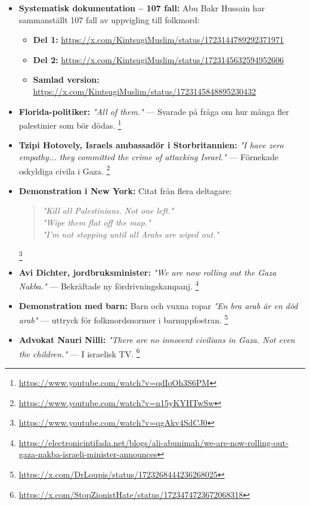 \begin{itemize}
    \item[] \textbf{Systematisk dokumentation – 107 fall:}
    Abu Bakr Hussain har sammanställt 107 fall av uppvigling till folkmord:
    \begin{itemize}
        \item \textbf{Del 1:} \url{https://x.com/KintsugiMuslim/status/1723144789292371971}
        \item \textbf{Del 2:} \url{https://x.com/KintsugiMuslim/status/1723145632594952606}
        \item \textbf{Samlad version:} \url{https://x.com/KintsugiMuslim/status/1723145848895230432}
    \end{itemize}

    \item \textbf{Florida-politiker:} \textit{"All of them."} — Svarade på fråga om hur många fler palestinier som bör dödas. \footnote{\url{https://www.youtube.com/watch?v=qdIoOh3S6PM}}

    \item \textbf{Tzipi Hotovely, Israels ambassadör i Storbritannien:} \textit{"I have zero empathy... they committed the crime of attacking Israel."} — Förnekade oskyldiga civila i Gaza. \footnote{\url{https://www.youtube.com/watch?v=n15yKYHTwSw}}

    \item \textbf{Demonstration i New York:} Citat från flera deltagare:
    \begin{quote}
    \textit{"Kill all Palestinians. Not one left."}\\
    \textit{"Wipe them flat off the map."}\\
    \textit{"I’m not stopping until all Arabs are wiped out."}
    \end{quote}
    \footnote{\url{https://www.youtube.com/watch?v=qgAkv4SdCJ0}}

    \item \textbf{Avi Dichter, jordbruksminister:} \textit{"We are now rolling out the Gaza Nakba."} — Bekräftade ny fördrivningskampanj. \footnote{\url{https://electronicintifada.net/blogs/ali-abunimah/we-are-now-rolling-out-gaza-nakba-israeli-minister-announces}}

    \item \textbf{Demonstration med barn:} Barn och vuxna ropar \textit{"En bra arab är en död arab"} — uttryck för folkmordsnormer i barnuppfostran. \footnote{\url{https://x.com/DrLoupis/status/1723268444236268025}}

    \item \textbf{Advokat Nauri Nilli:} \textit{"There are no innocent civilians in Gaza. Not even the children."} — I israelisk TV. \footnote{\url{https://x.com/StopZionistHate/status/1723474723672068318}}


\end{itemize}
